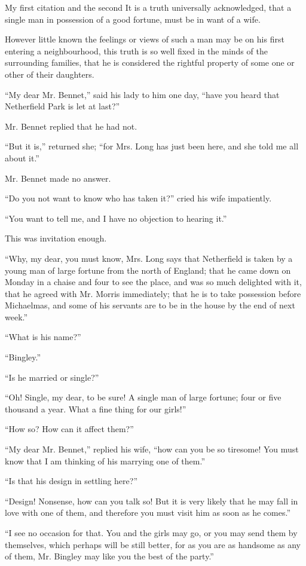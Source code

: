 My first citation \parencite{latexcompanion} and the second \parencite{einstein}
It is a truth universally acknowledged, that a single man in
possession of a good fortune, must be in want of a wife.

However little known the feelings or views of such a man may be
on his first entering a neighbourhood, this truth is so well
fixed in the minds of the surrounding families, that he is
considered the rightful property of some one or other of their
daughters.

“My dear Mr. Bennet,” said his lady to him one day, “have you
heard that Netherfield Park is let at last?”

Mr. Bennet replied that he had not.

“But it is,” returned she; “for Mrs. Long has just been here, and
she told me all about it.”

Mr. Bennet made no answer.

“Do you not want to know who has taken it?” cried his wife
impatiently.

“You want to tell me, and I have no objection to hearing it.”

This was invitation enough.

“Why, my dear, you must know, Mrs. Long says that Netherfield is
taken by a young man of large fortune from the north of England;
that he came down on Monday in a chaise and four to see the
place, and was so much delighted with it, that he agreed with Mr.
Morris immediately; that he is to take possession before
Michaelmas, and some of his servants are to be in the house by
the end of next week.”

“What is his name?”

“Bingley.”

“Is he married or single?”

“Oh! Single, my dear, to be sure! A single man of large fortune;
four or five thousand a year. What a fine thing for our girls!”

“How so? How can it affect them?”

“My dear Mr. Bennet,” replied his wife, “how can you be so
tiresome! You must know that I am thinking of his marrying one of
them.”

“Is that his design in settling here?”

“Design! Nonsense, how can you talk so! But it is very likely
that he may fall in love with one of them, and therefore you
must visit him as soon as he comes.”

“I see no occasion for that. You and the girls may go, or you may
send them by themselves, which perhaps will be still better, for
as you are as handsome as any of them, Mr. Bingley may like you
the best of the party.”


